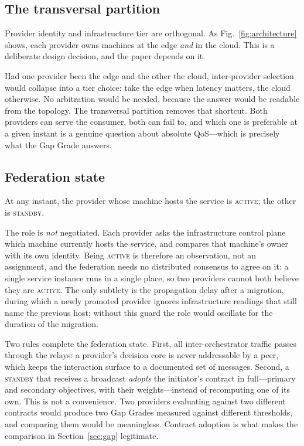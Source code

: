 \documentclass[conference]{IEEEtran}
\begin{document}
\subsection{The transversal partition}

Provider identity and infrastructure tier are orthogonal. As
Fig.~\ref{fig:architecture} shows, each provider owns machines at the edge
\emph{and} in the cloud. This is a deliberate design decision, and the paper
depends on it.

Had one provider been the edge and the other the cloud, inter-provider
selection would collapse into a tier choice: take the edge when latency
matters, the cloud otherwise. No arbitration would be needed, because the
answer would be readable from the topology. The transversal partition removes
that shortcut. Both providers can serve the consumer, both can fail to, and
which one is preferable at a given instant is a genuine question about
absolute QoS---which is precisely what the Gap Grade answers.

\subsection{Federation state}

At any instant, the provider whose machine hosts the service is
\textsc{active}; the other is \textsc{standby}.

The role is \emph{not} negotiated. Each provider asks the infrastructure
control plane which machine currently hosts the service, and compares that
machine's owner with its own identity. Being \textsc{active} is therefore an
observation, not an assignment, and the federation needs no distributed
consensus to agree on it: a single service instance runs in a single place,
so two providers cannot both believe they are \textsc{active}. The only
subtlety is the propagation delay after a migration, during which a newly
promoted provider ignores infrastructure readings that still name the previous
host; without this guard the role would oscillate for the duration of the
migration.

Two rules complete the federation state. First, all inter-orchestrator traffic
passes through the relays: a provider's decision core is never addressable by
a peer, which keeps the interaction surface to a documented set of messages.
Second, a \textsc{standby} that receives a broadcast \emph{adopts} the
initiator's contract in full---primary and secondary objectives, with their
weights---instead of recomputing one of its own. This is not a convenience.
Two providers evaluating against two different contracts would produce two Gap
Grades measured against different thresholds, and comparing them would be
meaningless. Contract adoption is what makes the comparison in
Section~\ref{sec:gap} legitimate.
\end{document}
